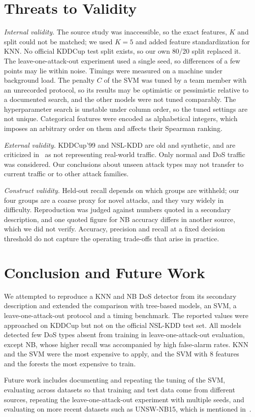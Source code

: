 \documentclass[conference]{IEEEtran}
\begin{document}
\section{Threats to Validity}\label{sec:threats}
\emph{Internal validity.} The source study was inaccessible, so the exact features, $K$ and split could not be matched; we used $K=5$ and added feature standardization for KNN. No official KDDCup test split exists, so our own 80/20 split replaced it. The leave-one-attack-out experiment used a single seed, so differences of a few points may lie within noise. Timings were measured on a machine under background load. The penalty $C$ of the SVM was tuned by a team member with an unrecorded protocol, so its results may be optimistic or pessimistic relative to a documented search, and the other models were not tuned comparably. The hyperparameter search is unstable under column order, so the tuned settings are not unique. Categorical features were encoded as alphabetical integers, which imposes an arbitrary order on them and affects their Spearman ranking.

\emph{External validity.} KDDCup'99 and NSL-KDD are old and synthetic, and are criticized in~\cite{tundis2025} as not representing real-world traffic. Only normal and DoS traffic was considered. Our conclusions about unseen attack types may not transfer to current traffic or to other attack families.

\emph{Construct validity.} Held-out recall depends on which groups are withheld; our four groups are a coarse proxy for novel attacks, and they vary widely in difficulty. Reproduction was judged against numbers quoted in a secondary description, and one quoted figure for NB accuracy differs in another source, which we did not verify. Accuracy, precision and recall at a fixed decision threshold do not capture the operating trade-offs that arise in practice.

\section{Conclusion and Future Work}\label{sec:conclusion}
We attempted to reproduce a KNN and NB DoS detector from its secondary description and extended the comparison with tree-based models, an SVM, a leave-one-attack-out protocol and a timing benchmark. The reported values were approached on KDDCup but not on the official NSL-KDD test set. All models detected few DoS types absent from training in leave-one-attack-out evaluation, except NB, whose higher recall was accompanied by high false-alarm rates. KNN and the SVM were the most expensive to apply, and the SVM with 8 features and the forests the most expensive to train.

Future work includes documenting and repeating the tuning of the SVM, evaluating across datasets so that training and test data come from different sources, repeating the leave-one-attack-out experiment with multiple seeds, and evaluating on more recent datasets such as UNSW-NB15, which is mentioned in~\cite{tundis2025}.



\end{document}
